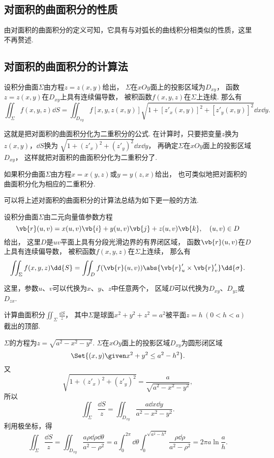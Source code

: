 \subsection{对面积的曲面积分的性质}
由对面积的曲面积分的定义可知，它具有与对弧长的曲线积分相类似的性质，这里不再赘述.

\subsection{对面积的曲面积分的计算法}
\begin{theorem}
设积分曲面\(\Sigma\)由方程\(z=z(x,y)\)给出，
\(\Sigma\)在\(xOy\)面上的投影区域为\(D_{xy}\)，
函数\(z=z(x,y)\)在\(D_{xy}\)上具有连续偏导数，
被积函数\(f(x,y,z)\)在\(\Sigma\)上连续.
那么有\begin{equation}\label{equation:线积分与面积分.第一类曲面积分的计算式1}
	\iint_\Sigma f(x,y,z) \dd{S}
	= \iint_{D_{xy}} f[x,y,z(x,y)] \sqrt{1+[z'_x(x,y)]^2+[z'_y(x,y)]^2} \dd{x}\dd{y}.
\end{equation}
\end{theorem}
这就是把对面积的曲面积分化为二重积分的公式.
在计算时，只要把变量\(z\)换为\(z(x,y)\)，\(\dd{S}\)换为
\(\sqrt{1+(z'_x)^2+(z'_y)^2} \dd{x}\dd{y}\)，
再确定\(\Sigma\)在\(xOy\)面上的投影区域\(D_{xy}\)，
这样就把对面积的曲面积分化为二重积分了.

如果积分曲面\(\Sigma\)由方程\(x=x(y,z)\)或\(y=y(z,x)\)给出，
也可类似地把对面积的曲面积分化为相应的二重积分.

可以将上述对面积的曲面积分的计算法总结为如下更一般的方法.
\begin{theorem}
设积分曲面\(\Sigma\)由二元向量值参数方程\[
	\vb{r}(u,v) = x(u,v) \vb{i} + y(u,v) \vb{j} + z(u,v) \vb{k},
	\quad (u,v) \in D
\]给出，
这里\(D\)是\(uv\)平面上具有分段光滑边界的有界闭区域，
函数\(\vb{r}(u,v)\)在\(D\)上具有连续偏导数，
被积函数\(f(x,y,z)\)在\(\Sigma\)上连续，
那么有\[
	\iint_\Sigma f(x,y,z) \dd{S}
	= \iint_D f(\vb{r}(u,v)) \abs{\vb{r}'_u \times \vb{r}'_v} \dd{\sigma}.
\]
\end{theorem}
这里，参数\(u\)、\(v\)可以代换为\(x\)、\(y\)、\(z\)中任意两个，
区域\(D\)可以代换为\(D_{xy}\)、\(D_{yz}\)或\(D_{zx}\).

\begin{example}
计算曲面积分\(\iint_\Sigma \frac{\dd{S}}{z}\)，
其中\(\Sigma\)是球面\(x^2+y^2+z^2=a^2\)被平面\(z = h\ (0<h<a)\)截出的顶部.
\begin{solution}
\(\Sigma\)的方程为\(z = \sqrt{a^2-x^2-y^2}\).
\(\Sigma\)在\(xOy\)面上的投影区域\(D_{xy}\)为圆形闭区域\[
	\Set{(x,y) \given x^2+y^2 \leq a^2-h^2}.
\]
又\[
	\sqrt{1+(z'_x)^2+(z'_y)^2} = \frac{a}{\sqrt{a^2-x^2-y^2}},
\]
所以\[
	\iint_\Sigma \frac{\dd{S}}{z}
	= \iint_{D_{xy}} \frac{a\dd{x}\dd{y}}{a^2-x^2-y^2}.
\]
利用极坐标，得\[
	\iint_\Sigma \frac{\dd{S}}{z}
	= \iint_{D_{xy}} \frac{a\rho\dd{\rho}\dd{\theta}}{a^2-\rho^2}
	= a \int_0^{2\pi} \dd{\theta} \int_0^{\sqrt{a^2-h^2}} \frac{\rho\dd{\rho}}{a^2-\rho^2}
	= 2\pi a \ln\frac{a}{h}.
\]
\end{solution}
\end{example}


